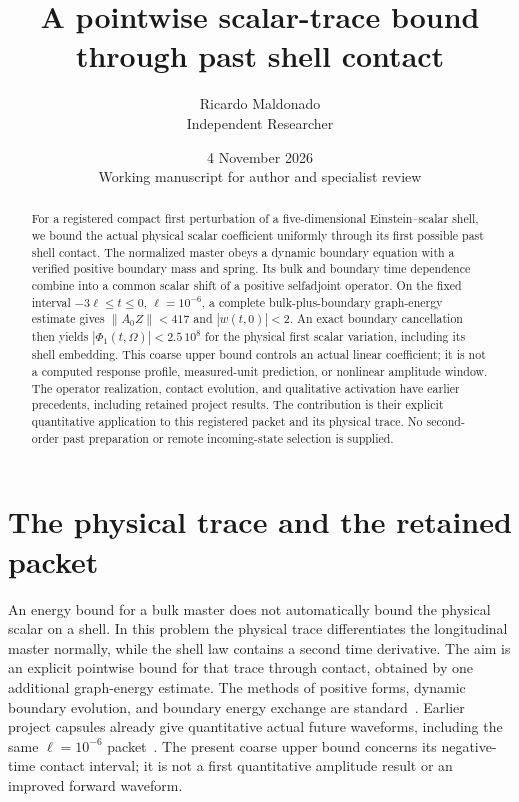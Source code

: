 \documentclass[11pt]{article}
\title{A pointwise scalar-trace bound through past shell contact}
\author{Ricardo Maldonado\\Independent Researcher}
\date{4 November 2026\\[3pt]\small Working manuscript for author and specialist review}
\newcommand{\norm}[1]{\lVert #1\rVert}
\begin{document}
\maketitle
\begin{abstract}
For a registered compact first perturbation of a five-dimensional
Einstein--scalar shell, we bound the actual physical scalar coefficient
uniformly through its first possible past shell contact.
The normalized master obeys a dynamic boundary equation with a verified
positive boundary mass and spring. Its bulk and boundary time dependence
combine into a common scalar shift of a positive selfadjoint operator.
On the fixed interval $-3\ell\le t\le0$, $\ell=10^{-6}$, a complete
bulk-plus-boundary graph-energy estimate gives
$\norm{A_0Z}<417$ and $|w(t,0)|<2$. An exact boundary cancellation then
yields $|\Phi_1(t,\Omega)|<2.5\,10^8$ for the physical first scalar
variation, including its shell embedding.
This coarse upper bound controls an actual linear coefficient; it is not
a computed response profile, measured-unit prediction, or nonlinear
amplitude window. The operator realization, contact evolution, and qualitative
activation have earlier precedents, including retained project results.
The contribution is their explicit quantitative application to this
registered packet and its physical trace. No second-order past preparation
or remote incoming-state selection is supplied.
\end{abstract}

\section{The physical trace and the retained packet}
An energy bound for a bulk master does not automatically bound the physical
scalar on a shell. In this problem the physical trace differentiates the
longitudinal master normally, while the shell law contains a second time
derivative. The aim is an explicit pointwise bound for that trace through
contact, obtained by one additional graph-energy estimate.
The methods of positive forms, dynamic boundary evolution, and boundary
energy exchange are standard~\cite{zahn,marta}.
Earlier project capsules already give quantitative actual future
waveforms, including the same $\ell=10^{-6}$ packet~\cite{waveforms}.
The present coarse upper bound concerns its negative-time contact
interval; it is not a first quantitative amplitude result or an improved
forward waveform.
\end{document}
